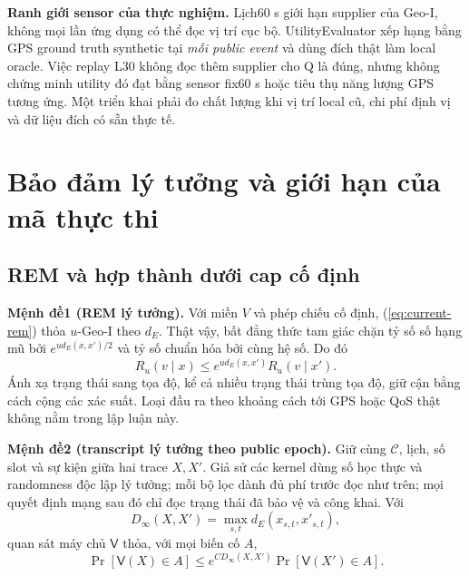 \textbf{Ranh giới sensor của thực nghiệm.} Lịch60 s giới hạn supplier của Geo-I, không mọi lần ứng dụng có thể đọc vị trí cục bộ. UtilityEvaluator xếp hạng bằng GPS ground truth synthetic tại \emph{mỗi public event} và dùng đích thật làm local oracle. Việc replay L30 không đọc thêm supplier cho Q là đúng, nhưng không chứng minh utility đó đạt bằng sensor fix60 s hoặc tiêu thụ năng lượng GPS tương ứng. Một triển khai phải đo chất lượng khi vị trí local cũ, chi phí định vị và dữ liệu đích có sẵn thực tế.



\section{Bảo đảm lý tưởng và giới hạn của mã thực thi}
\label{sec:current-ideal-claim}

\subsection{REM và hợp thành dưới cap cố định}

\noindent\textbf{Mệnh đề1 (REM lý tưởng).} Với miền $V$ và phép chiếu cố định, (\ref{eq:current-rem}) thỏa $u$-Geo-I theo $d_E$. Thật vậy, bất đẳng thức tam giác chặn tỷ số số hạng mũ bởi $e^{u d_E(x,x')/2}$ và tỷ số chuẩn hóa bởi cùng hệ số. Do đó
\[
 R_u(v\mid x)\leq e^{u d_E(x,x')}R_u(v\mid x').
\]
Ánh xạ trạng thái sang tọa độ, kể cả nhiều trạng thái trùng tọa độ, giữ cận bằng cách cộng các xác suất. Loại đầu ra theo khoảng cách tới GPS hoặc QoS thật không nằm trong lập luận này.

\noindent\textbf{Mệnh đề2 (transcript lý tưởng theo public epoch).} Giữ cùng $\mathcal C$, lịch, số slot và sự kiện giữa hai trace $X,X'$. Giả sử các kernel dùng số học thực và randomness độc lập lý tưởng; mỗi bộ lọc dành đủ phí trước đọc như trên; mọi quyết định mạng sau đó chỉ đọc trạng thái đã bảo vệ và công khai. Với
\[
 D_\infty(X,X')=\max_{s,t}d_E(x_{s,t},x'_{s,t}),
\]
quan sát máy chủ $\mathsf V$ thỏa, với mọi biến cố $A$,
\begin{equation}
 \Pr[\mathsf V(X)\in A]\leq
 e^{C D_\infty(X,X')}\Pr[\mathsf V(X')\in A].
 \label{eq:current-transcript-bound}
\end{equation}

